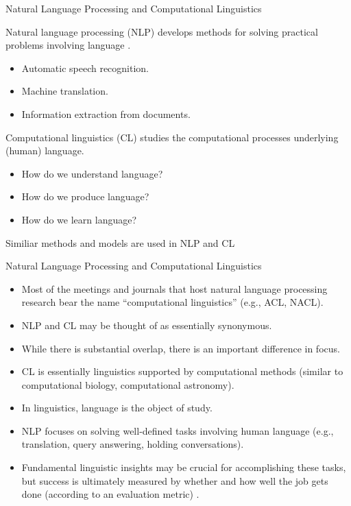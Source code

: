 \documentclass[handout]{beamer}
\begin{document}
\begin{frame}{Natural Language Processing and Computational Linguistics}
\begin{scriptsize}
Natural language processing (NLP) develops methods for solving practical problems involving language \cite{JohnsonMLSS}. \\


\begin{itemize}
\item Automatic speech recognition.
\item Machine translation.
\item Information extraction from documents.
\end{itemize}

Computational linguistics (CL) studies the computational processes underlying (human) language.

\begin{itemize}
 \item How do we understand language?
 \item How do we produce language?
 \item How do we learn language?
\end{itemize}

Similiar methods and models are used in NLP and CL
\end{scriptsize}
\end{frame}


\begin{frame}{Natural Language Processing and Computational Linguistics}
\begin{scriptsize}
\begin{itemize}
 \item Most of the meetings and journals that host natural language processing research bear the name ``computational linguistics'' (e.g., ACL, NACL). \cite{jacobbook}
 \item NLP and CL may be thought of as essentially synonymous.
 \item While there is substantial overlap, there is an important difference in focus.
 \item CL is essentially linguistics supported by computational methods (similar to computational biology, computational astronomy).
 \item In linguistics, language is the object of study.
 \item NLP focuses on solving well-defined tasks involving human language (e.g., translation, query answering, holding conversations).
 \item Fundamental linguistic insights may be crucial for accomplishing these tasks, but success is ultimately measured by whether and how well the job gets done (according to an evaluation metric) \cite{jacobbook} .
\end{itemize}


\end{scriptsize}
\end{frame}
\end{document}
